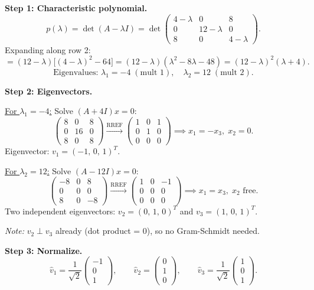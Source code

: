 \documentclass[12pt,a3paper]{article}
\begin{document}
\begin{tcolorbox}[enhanced,breakable,
  colback=cE!4,colframe=cE,boxrule=0.8pt,arc=5pt,
  title={\textbf{Answer --- Orthogonal Diagonalization of $A$}},
  fonttitle=\bfseries\color{white},colbacktitle=cE]

\textbf{Step 1: Characteristic polynomial.}
\[
p(\lambda)=\det(A-\lambda I)=\det\begin{pmatrix}4-\lambda&0&8\\0&12-\lambda&0\\8&0&4-\lambda\end{pmatrix}.
\]
Expanding along row 2:
\[
=(12-\lambda)\bigl[(4-\lambda)^2-64\bigr]=(12-\lambda)(\lambda^2-8\lambda-48)=(12-\lambda)^2(\lambda+4).
\]
\[
\boxed{\text{Eigenvalues: }\lambda_1=-4\;(\text{mult }1),\quad\lambda_2=12\;(\text{mult }2).}
\]

\textbf{Step 2: Eigenvectors.}

\underline{For $\lambda_1=-4$:} Solve $(A+4I)x=0$:
\[
\begin{pmatrix}8&0&8\\0&16&0\\8&0&8\end{pmatrix}\xrightarrow{\text{RREF}}\begin{pmatrix}1&0&1\\0&1&0\\0&0&0\end{pmatrix}
\implies x_1=-x_3,\;x_2=0.
\]
Eigenvector: $v_1=(-1,\,0,\,1)^T$.

\underline{For $\lambda_2=12$:} Solve $(A-12I)x=0$:
\[
\begin{pmatrix}-8&0&8\\0&0&0\\8&0&-8\end{pmatrix}\xrightarrow{\text{RREF}}\begin{pmatrix}1&0&-1\\0&0&0\\0&0&0\end{pmatrix}
\implies x_1=x_3,\;x_2\text{ free}.
\]
Two independent eigenvectors: $v_2=(0,\,1,\,0)^T$ and $v_3=(1,\,0,\,1)^T$.

\textit{Note:} $v_2\perp v_3$ already (dot product = 0), so no Gram-Schmidt needed.

\medskip
\textbf{Step 3: Normalize.}
\[
\hat{v}_1=\frac{1}{\sqrt{2}}\begin{pmatrix}-1\\0\\1\end{pmatrix},\qquad
\hat{v}_2=\begin{pmatrix}0\\1\\0\end{pmatrix},\qquad
\hat{v}_3=\frac{1}{\sqrt{2}}\begin{pmatrix}1\\0\\1\end{pmatrix}.
\]


\end{tcolorbox}
\end{document}

